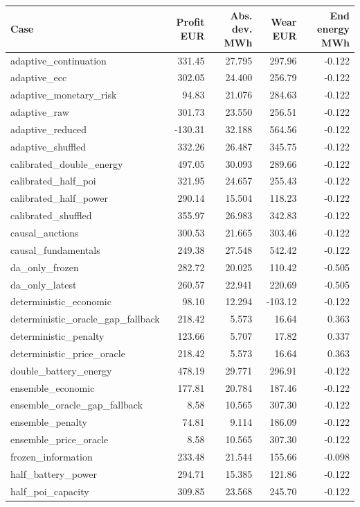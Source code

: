 \begingroup\small
\begin{longtable}{lrrrr}
\toprule
Case & Profit EUR & Abs. dev. MWh & Wear EUR & End energy MWh\\
\midrule\endhead
adaptive\_continuation & 331.45 & 27.795 & 297.96 & -0.122\\
adaptive\_ecc & 302.05 & 24.400 & 256.79 & -0.122\\
adaptive\_monetary\_risk & 94.83 & 21.076 & 284.63 & -0.122\\
adaptive\_raw & 301.73 & 23.550 & 256.51 & -0.122\\
adaptive\_reduced & -130.31 & 32.188 & 564.56 & -0.122\\
adaptive\_shuffled & 332.26 & 26.487 & 345.75 & -0.122\\
calibrated\_double\_energy & 497.05 & 30.093 & 289.66 & -0.122\\
calibrated\_half\_poi & 321.95 & 24.657 & 255.43 & -0.122\\
calibrated\_half\_power & 290.14 & 15.504 & 118.23 & -0.122\\
calibrated\_shuffled & 355.97 & 26.983 & 342.83 & -0.122\\
causal\_auctions & 300.53 & 21.665 & 303.46 & -0.122\\
causal\_fundamentals & 249.38 & 27.548 & 542.42 & -0.122\\
da\_only\_frozen & 282.72 & 20.025 & 110.42 & -0.505\\
da\_only\_latest & 260.57 & 22.941 & 220.69 & -0.505\\
deterministic\_economic & 98.10 & 12.294 & -103.12 & -0.122\\
deterministic\_oracle\_gap\_fallback & 218.42 & 5.573 & 16.64 & 0.363\\
deterministic\_penalty & 123.66 & 5.707 & 17.82 & 0.337\\
deterministic\_price\_oracle & 218.42 & 5.573 & 16.64 & 0.363\\
double\_battery\_energy & 478.19 & 29.771 & 296.91 & -0.122\\
ensemble\_economic & 177.81 & 20.784 & 187.46 & -0.122\\
ensemble\_oracle\_gap\_fallback & 8.58 & 10.565 & 307.30 & -0.122\\
ensemble\_penalty & 74.81 & 9.114 & 186.09 & -0.122\\
ensemble\_price\_oracle & 8.58 & 10.565 & 307.30 & -0.122\\
frozen\_information & 233.48 & 21.544 & 155.66 & -0.098\\
half\_battery\_power & 294.71 & 15.385 & 121.86 & -0.122\\
half\_poi\_capacity & 309.85 & 23.568 & 245.70 & -0.122\\
\bottomrule
\end{longtable}
\endgroup
